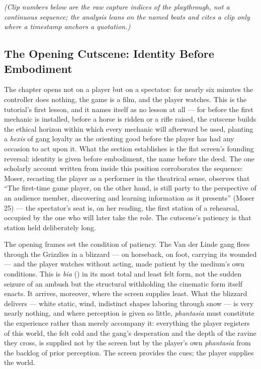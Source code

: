 \textit{(Clip numbers below are the raw capture indices of the playthrough, not a continuous sequence; the analysis leans on the named beats and cites a clip only where a timestamp anchors a quotation.)}

\bigskip

\subsection*{The Opening Cutscene: Identity Before Embodiment}

The chapter opens not on a player but on a spectator: for nearly six minutes the controller does nothing, the game is a film, and the player watches. This is the tutorial's first lesson, and it names itself as no lesson at all — for before the first mechanic is installed, before a horse is ridden or a rifle raised, the cutscene builds the ethical horizon within which every mechanic will afterward be used, planting a \textit{hexis} of gang loyalty as the orienting good before the player has had any occasion to act upon it. What the section establishes is the flat screen's founding reversal: identity is given before embodiment, the name before the deed.
The one scholarly account written from inside this position corroborates the sequence: Moser, recasting the player as a performer in the theatrical sense, observes that ``The first-time game player, on the other hand, is still party to the perspective of an audience member, discovering and learning information as it presents'' (Moser 25) — the spectator's seat is, on her reading, the first station of a rehearsal, occupied by the one who will later take the role. The cutscene's patiency is that station held deliberately long.

The opening frames set the condition of patiency. The Van der Linde gang flees through the Grizzlies in a blizzard — on horseback, on foot, carrying its wounded — and the player watches without acting, made patient by the medium's own conditions. This is \textit{bia} () in its most total and least felt form, not the sudden seizure of an ambush but the structural withholding the cinematic form itself enacts. It arrives, moreover, where the screen supplies least. What the blizzard delivers — white static, wind, indistinct shapes laboring through snow — is very nearly nothing, and where perception is given so little, \textit{phantasia} must constitute the experience rather than merely accompany it: everything the player registers of this world, the felt cold and the gang's desperation and the depth of the ravine they cross, is supplied not by the screen but by the player's own \textit{phantasia} from the backlog of prior perception. The screen provides the cues; the player supplies the world.

